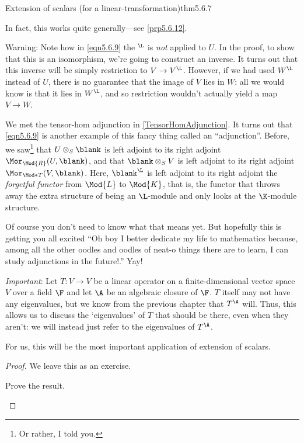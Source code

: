 \begin{thm}{Extension of scalars (for a linear-transformation)}{thm5.6.7}
\begin{rmk}
		In fact, this works quite generally---see \cref{prp5.6.12}.
	\end{rmk}
	\begin{rmk}
		Warning:  Note how in \eqref{eqn5.6.9} the $^{\L}$ is \emph{not} applied to $U$.  In the proof, to show that this is an isomorphism, we're going to construct an inverse.  It turns out that this inverse will be simply restriction to $V\rightarrow V^{\L}$.  However, if we had used $W^{\L}$ instead of $U$, there is no guarantee that the image of $V$ lies in $W$:  all we would know is that it lies in $W^{\L}$, and so restriction wouldn't actually yield a map $V\rightarrow W$.
	\end{rmk}
	\begin{rmk}
		We met the tensor-hom adjunction in \cref{TensorHomAdjunction}.  It turns out that \eqref{eqn5.6.9} is another example of this fancy thing called an ``adjunction''.  Before, we saw\footnote{Or rather, I told you.} that $U\otimes _S\blank$ is left adjoint to its right adjoint $\Mor _{\Mod{R}}(U,\blank )$, and that $\blank \otimes _SV$ is left adjoint to its right adjoint $\Mor _{\Mod*{T}}(V,\blank )$.  Here, $\blank ^{\L}$ is left adjoint to its right adjoint the \emph{forgetful functor} from $\Mod{L}$ to $\Mod{K}$, that is, the functor that throws away the extra structure of being an $\L$-module and only looks at the $\K$-module structure.
		
		Of course you don't need to know what that means yet.  But hopefully this is getting you all excited ``Oh boy I better dedicate my life to mathematics because, among all the other oodles and oodles of neat-o things there are to learn, I can study adjunctions in the future!.''  Yay!
	\end{rmk}
	\begin{rmk}
		\emph{Important}:  Let $T\colon V\rightarrow V$ be a linear operator on a finite-dimensional vector space $V$ over a field $\F$ and let $\A$ be an algebraic closure of $\F$.  $T$ itself may not have any eigenvalues, but we know from the previous chapter that $T^{\A}$ will.  Thus, this allows us to discuss the `eigenvalues' of $T$ that should be there, even when they aren't:  we will instead just refer to the eigenvalues of $T^{\A}$.
		
		For us, this will be the most important application of extension of scalars.
	\end{rmk}
	\begin{proof}
		We leave this as an exercise.
		\begin{exr}[breakable=false]{}{}
			Prove the result.
		\end{exr}
	\end{proof}
\end{thm}


